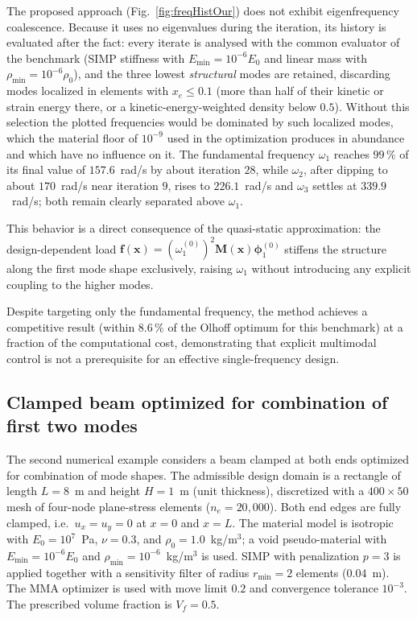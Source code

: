 \documentclass[pdflatex,lineno,sn-mathphys-ay]{sn-jnl}
\begin{document}
The proposed approach (Fig.~\ref{fig:freqHistOur}) does not exhibit eigenfrequency coalescence.
Because it uses no eigenvalues during the iteration, its history is evaluated after the fact: every iterate is analysed with the common evaluator of the benchmark (SIMP stiffness with $E_\mathrm{min} = 10^{-6}E_0$ and linear mass with $\rho_\mathrm{min} = 10^{-6}\rho_0$), and the three lowest \emph{structural} modes are retained, discarding modes localized in elements with $x_e \le 0.1$ (more than half of their kinetic or strain energy there, or a kinetic-energy-weighted density below $0.5$).
Without this selection the plotted frequencies would be dominated by such localized modes, which the material floor of $10^{-9}$ used in the optimization produces in abundance and which have no influence on it.
The fundamental frequency $\omega_1$ reaches $99\,\%$ of its final value of $157.6$~rad/s by about iteration $28$, while $\omega_2$, after dipping to about $170$~rad/s near iteration $9$, rises to $226.1$~rad/s and $\omega_3$ settles at $339.9$~rad/s; both remain clearly separated above $\omega_1$.

This behavior is a direct consequence of the quasi-static approximation: the design-dependent load $\mathbf{f}(\mathbf{x}) = (\omega_1^{(0)})^2 \mathbf{M}(\mathbf{x})\boldsymbol{\phi}_1^{(0)}$ stiffens the structure along the first mode shape exclusively, raising $\omega_1$ without introducing any explicit coupling to the higher modes.

Despite targeting only the fundamental frequency, the method achieves a competitive result (within $8.6\,\%$ of the Olhoff optimum for this benchmark) at a fraction of the computational cost, demonstrating that explicit multimodal control is not a prerequisite for an effective single-frequency design.

\subsection{Clamped beam optimized for combination of first two modes}\label{subsec:clampedBeam}
The second numerical example considers a beam clamped at both ends optimized for combination of mode shapes. The admissible design domain is a rectangle of length $L=8$~m and height $H=1$~m (unit thickness), discretized with a $400\times 50$ mesh of four-node plane-stress elements ($n_e=20{,}000$). Both end edges are fully clamped, i.e.\ $u_x=u_y=0$ at $x=0$ and $x=L$. The material model is isotropic with $E_0=10^7$~Pa, $\nu=0.3$, and $\rho_0=1.0$~kg/m$^3$; a void pseudo-material with $E_\mathrm{min}=10^{-6}E_0$ and $\rho_\mathrm{min}=10^{-6}$~kg/m$^3$ is used. SIMP with penalization $p=3$ is applied together with a sensitivity filter of radius $r_{\min}=2$ elements ($0.04$~m). The MMA optimizer is used with move limit $0.2$ and convergence tolerance $10^{-3}$. The prescribed volume fraction is $V_f=0.5$.
\end{document}
